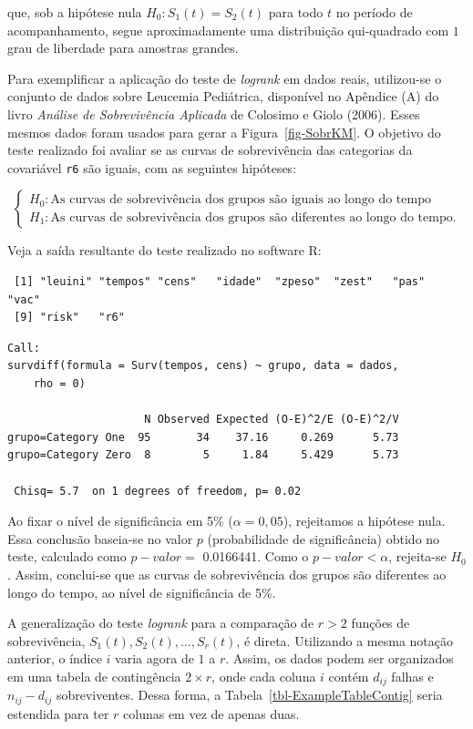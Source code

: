 \documentclass[
  12pt,
  letterpaper,
  DIV=11,
  numbers=noendperiod]{scrreprt}
\begin{document}
que, sob a hipótese nula \(H_{0}: S_{1}(t) = S_{2}(t)\) para todo \(t\)
no período de acompanhamento, segue aproximadamente uma distribuição
qui-quadrado com \(1\) grau de liberdade para amostras grandes.

Para exemplificar a aplicação do teste de \emph{logrank} em dados reais,
utilizou-se o conjunto de dados sobre Leucemia Pediátrica, disponível no
Apêndice (A) do livro \emph{Análise de Sobrevivência Aplicada} de
Colosimo e Giolo (2006). Esses mesmos dados foram usados para gerar a
Figura~\ref{fig-SobrKM}. O objetivo do teste realizado foi avaliar se as
curvas de sobrevivência das categorias da covariável \texttt{r6} são
iguais, com as seguintes hipóteses:

\[
\begin{cases}
  H_{0}: \text{As curvas de sobrevivência dos grupos são iguais ao longo do tempo} \\
  H_{1}: \text{As curvas de sobrevivência dos grupos são diferentes ao longo do tempo.}
\end{cases}
\]

Veja a saída resultante do teste realizado no software R:

\begin{verbatim}
 [1] "leuini" "tempos" "cens"   "idade"  "zpeso"  "zest"   "pas"    "vac"   
 [9] "risk"   "r6"    
\end{verbatim}

\begin{verbatim}
Call:
survdiff(formula = Surv(tempos, cens) ~ grupo, data = dados, 
    rho = 0)

                     N Observed Expected (O-E)^2/E (O-E)^2/V
grupo=Category One  95       34    37.16     0.269      5.73
grupo=Category Zero  8        5     1.84     5.429      5.73

 Chisq= 5.7  on 1 degrees of freedom, p= 0.02 
\end{verbatim}

Ao fixar o nível de significância em 5\% (\(\alpha = 0,05\)), rejeitamos
a hipótese nula. Essa conclusão baseia-se no valor \(p\) (probabilidade
de significância) obtido no teste, calculado como \(p-valor =\)
0.0166441. Como o \(p-valor < \alpha\), rejeita-se \(H_{0}\). Assim,
conclui-se que as curvas de sobrevivência dos grupos são diferentes ao
longo do tempo, ao nível de significância de 5\%.

A generalização do teste \emph{logrank} para a comparação de \(r > 2\)
funções de sobrevivência, \(S_{1}(t), S_{2}(t), \ldots, S_{r}(t)\), é
direta. Utilizando a mesma notação anterior, o índice \(i\) varia agora
de \(1\) a \(r\). Assim, os dados podem ser organizados em uma tabela de
contingência \(2 \times r\), onde cada coluna \(i\) contém \(d_{ij}\)
falhas e \(n_{ij} - d_{ij}\) sobreviventes. Dessa forma, a
Tabela~\ref{tbl-ExampleTableContig} seria estendida para ter \(r\)
colunas em vez de apenas duas.
\end{document}
